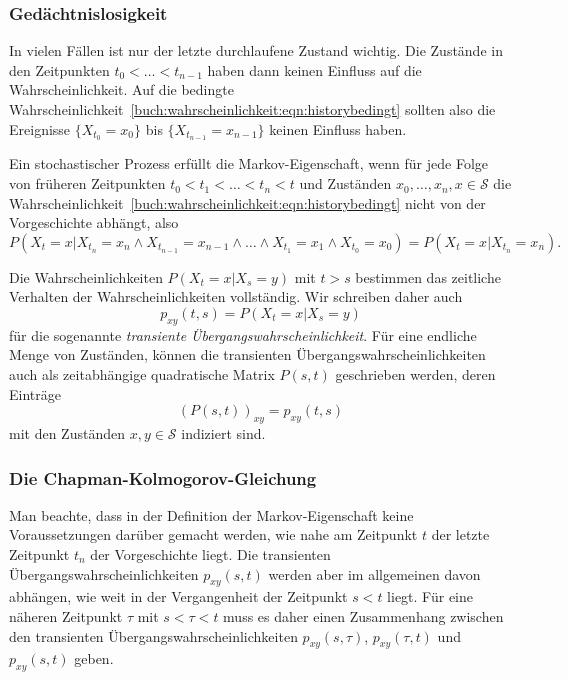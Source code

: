 \subsubsection{Gedächtnislosigkeit}
In vielen Fällen ist nur der letzte durchlaufene Zustand wichtig.
Die Zustände in den Zeitpunkten $t_0<\dots<t_{n-1}$ haben dann keinen
Einfluss auf die Wahrscheinlichkeit.
Auf die bedingte
Wahrscheinlichkeit~\eqref{buch:wahrscheinlichkeit:eqn:historybedingt}
sollten also die Ereignisse $\{X_{t_0}=x_0\}$ bis $\{X_{t_{n-1}}=x_{n-1}\}$
keinen Einfluss haben.

\begin{definition}
Ein stochastischer Prozess erfüllt die Markov-Eigenschaft, wenn 
für jede Folge von früheren Zeitpunkten $t_0<t_1<\dots <t_n<t$ und Zuständen
$x_0,\dots,x_n,x\in \mathcal{S}$ die 
Wahrscheinlichkeit~\eqref{buch:wahrscheinlichkeit:eqn:historybedingt}
nicht von der Vorgeschichte abhängt, also
\[
P(X_t = x|
X_{t_n}=x_n\wedge X_{t_{n-1}}=x_{n-1}\wedge\dots\wedge X_{t_1}=x_1\wedge
X_{t_0}=x_0)
=
P(X_t = x|
X_{t_n}=x_n).
\]
\end{definition}

Die Wahrscheinlichkeiten $P(X_t=x|X_s=y)$ mit $t>s$ bestimmen das
zeitliche Verhalten der Wahrscheinlichkeiten vollständig.
Wir schreiben daher auch
\[
p_{xy}(t, s)
=
P(X_t = x|X_s=y)
\]
für die sogenannte {\em transiente Übergangswahrscheinlichkeit}.
Für eine endliche Menge von Zuständen, können die transienten
Übergangswahrscheinlichkeiten auch als zeitabhängige 
quadratische Matrix $P(s,t)$ geschrieben werden, deren
Einträge
\[
(P(s,t))_{xy}
=
p_{xy}(t,s)
\]
mit den Zuständen $x,y\in\mathcal{S}$ indiziert sind.

\subsubsection{Die Chapman-Kolmogorov-Gleichung}
Man beachte, dass in der Definition der Markov-Eigenschaft
keine Voraussetzungen darüber gemacht werden, wie nahe
am Zeitpunkt $t$ der letzte Zeitpunkt $t_n$ der Vorgeschichte liegt.
Die transienten Übergangswahrscheinlichkeiten $p_{xy}(s,t)$ werden
aber im allgemeinen davon abhängen, wie weit in der Vergangenheit
der Zeitpunkt $s<t$ liegt.
Für eine näheren Zeitpunkt $\tau$ mit $s<\tau <t$ muss es daher
einen Zusammenhang zwischen den transienten Übergangswahrscheinlichkeiten
$p_{xy}(s,\tau)$, $p_{xy}(\tau,t)$ und $p_{xy}(s,t)$ geben.

